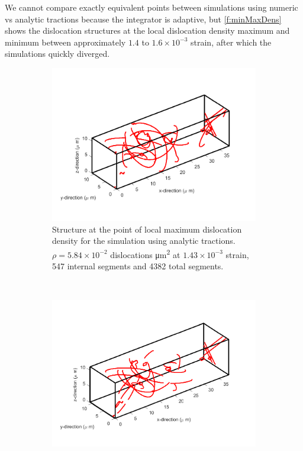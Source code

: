 We cannot compare exactly equivalent points between simulations using numeric vs analytic tractions because the integrator is adaptive, but \cref{f:minMaxDens} shows the dislocation structures at the local dislocation density maximum and minimum between approximately $1.4$ to $1.6\times 10^{-3}$ strain, after which the simulations quickly diverged.
\begin{figure}
    \centering
    \begin{subfigure}[t]{0.45\linewidth}
        \centering
        \includegraphics[width=\linewidth]{../data/maxDens_nSeg_547_nSegTot_4382_11-Mar-2021_8_tensile_ni_100.pdf}
        \caption[Structure at the point of local maximum dislocation density for the simulation using analytic tractions.]{Structure at the point of local maximum dislocation density for the simulation using analytic tractions. $\rho = 5.84 \times 10^{-2}$ dislocations \si{\micro\metre^{2}} at $ 1.43\times 10^{-3}$ strain, 547 internal segments and 4382 total segments.}
        \label{sf:maxDensAna}
    \end{subfigure}
    ~
    \begin{subfigure}[t]{0.45\linewidth}
        \centering
        \includegraphics[width=\linewidth]{../data/maxDens_nSeg_529_nSegTot_4819_11-Mar-2021_numT_8_tensile_ni_100.pdf}

\end{subfigure}
\end{figure}
